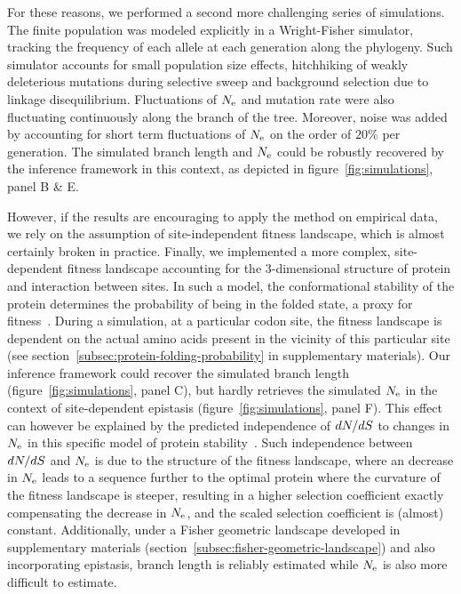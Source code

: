 For these reasons, we performed a second more challenging series of simulations.
The finite population was modeled explicitly in a Wright-Fisher simulator, tracking the frequency of each \gls{allele} at each generation along the phylogeny.
Such simulator accounts for small population size effects, hitchhiking of weakly deleterious mutations during selective sweep and background selection due to linkage disequilibrium.
Fluctuations of $N_{\mathrm{e}}$ and mutation rate were also fluctuating continuously along the branch of the tree.
Moreover, noise was added by accounting for short term fluctuations of $N_{\mathrm{e}}$ on the order of $20\%$ per generation.
The simulated branch length and $N_{\mathrm{e}}$ could be robustly recovered by the inference framework in this context, as depicted in figure~\ref{fig:simulations}, panel B \& E.

However, if the results are encouraging to apply the method on empirical data, we rely on the assumption of site-independent fitness landscape, which is almost certainly broken in practice.
Finally, we implemented a more complex, site-dependent fitness landscape accounting for the $3$-dimensional structure of protein and interaction between sites.
In such a model, the conformational stability of the protein determines the probability of being in the folded state, a proxy for fitness~\citep{Williams2006, Goldstein2011, Pollock2012}.
During a simulation, at a particular \gls{codon} site, the fitness landscape is dependent on the actual amino acids present in the vicinity of this particular site (see section~\ref{subsec:protein-folding-probability} in supplementary materials).
Our inference framework could recover the simulated branch length (figure~\ref{fig:simulations}, panel C), but hardly retrieves the simulated $N_{\mathrm{e}}$ in the context of site-dependent epistasis (figure~\ref{fig:simulations}, panel F).
This effect can however be explained by the predicted independence of $dN/dS$ to changes in $N_{\mathrm{e}}$ in this specific model of protein stability~\citep{Goldstein2013}.
Such independence between $dN/dS$ and $N_{\mathrm{e}}$ is due to the structure of the fitness landscape, where an decrease in $N_{\mathrm{e}}$ leads to a sequence further to the optimal protein where the curvature of the fitness landscape is steeper, resulting in a higher selection coefficient exactly compensating the decrease in $N_{\mathrm{e}}$, and the scaled selection coefficient is (almost) constant.
Additionally, under a Fisher geometric landscape developed in supplementary materials (section~\ref{subsec:fisher-geometric-landscape}) and also incorporating epistasis, branch length is reliably estimated while $N_{\mathrm{e}}$ is also more difficult to estimate.

